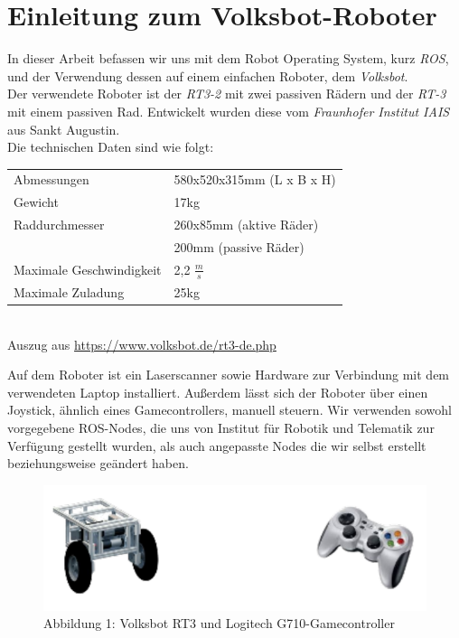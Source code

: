 \documentclass[11pt,a4paper]{article}
\begin{document}
\section{Einleitung zum Volksbot-Roboter}
In dieser Arbeit befassen wir uns mit dem Robot Operating System, kurz \textit{ROS}, und der 
Verwendung dessen auf einem einfachen Roboter, dem \textit{Volksbot}. \\
Der verwendete Roboter ist der \textit{RT3-2} mit zwei passiven Rädern und der \textit{RT-3} mit einem passiven Rad.
Entwickelt wurden diese vom \textit{Fraunhofer Institut IAIS} aus Sankt Augustin. \\
Die technischen Daten sind wie folgt: \\
\vspace{1mm}
\begin{center}
\begin{tabular}{| p{5cm} p{5cm} |}
  \hline
  Abmessungen & 580x520x315mm (L x B x H) \\
  Gewicht & 17kg \\
  
  Raddurchmesser & 260x85mm (aktive Räder) \\
   & 200mm (passive Räder) \\
  Maximale Geschwindigkeit & 2,2 $\frac{m}{s}$ \\
  
  Maximale Zuladung & 25kg \\
  \hline
\end{tabular} \\
\small{ Auszug aus \url{https://www.volksbot.de/rt3-de.php}}
\end{center}
\vspace{5mm}
Auf dem Roboter ist ein Laserscanner sowie Hardware zur Verbindung mit dem verwendeten
Laptop installiert. Außerdem lässt sich der Roboter über einen Joystick, ähnlich eines Gamecontrollers, manuell steuern. 
Wir verwenden sowohl vorgegebene ROS-Nodes, die uns von Institut für Robotik und Telematik zur Verfügung gestellt wurden, als auch angepasste Nodes die wir selbst erstellt beziehungsweise
geändert haben. 
\vspace{5mm}
\begin{figure}[H]
  \caption*{Abbildung 1: Volksbot RT3 und Logitech G710-Gamecontroller}
  \includegraphics[]{robotandcontroller.pdf}
  \centering
\end{figure}
\newpage
\end{document}
